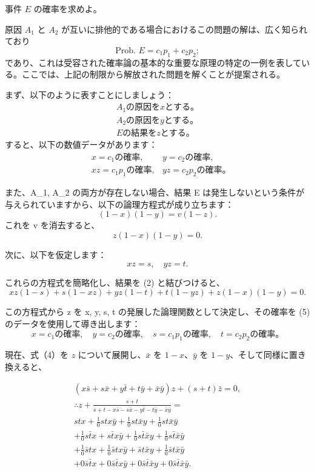 \documentclass[a4paper,11pt,openany]{ltjsbook}
\begin{document}
事件 \(E\) の確率を求めよ。

原因 \(A_1\) と \(A_2\) が互いに排他的である場合におけるこの問題の解は、広く知られており
\[
  \text{Prob. } E = c_1p_1 + c_2p_2;
\]
であり、これは受容された確率論の基本的な重要な原理の特定の一例を表している。ここでは、上記の制限から解放された問題を解くことが提案される。

まず、以下のように表すことにしましょう：
\[
\begin{array}{cccccc}
  A_1 の原因を x とする。\\
  A_2 の原因を y とする。\\
  E の結果を z とする。
\end{array}
\]
すると、以下の数値データがあります：
\begin{align*}
  &x = c_1 の確率,     &y = c_2 の確率,   \\
  &xz = c_1p_1 の確率, &yz = c_2p_2 の確率。 \tag{1}
\end{align*}

また、A\_1, A\_2 の両方が存在しない場合、結果 E は発生しないという条件が与えられていますから、以下の論理方程式が成り立ちます：
\[
(1-x)(1-y) = v(1-z).
\]
これを v を消去すると、
\[
z(1-x)(1-y) = 0. \tag{2}
\]

次に、以下を仮定します：
\[
xz = s, \quad yz = t. \tag{3}
\]

これらの方程式を簡略化し、結果を (2) と結びつけると、
\[
xz(1-s) + s(1-xz) + yz(1-t) + t(1-yz) + z(1-x)(1-y) = 0. \tag{4}
\]

この方程式から z を x, y, s, t の発展した論理関数として決定し、その確率を (5) のデータを使用して導き出します：
\[
x = c_1 の確率, \quad y = c_2 の確率, \quad
s = c_1p_1 の確率, \quad t = c_2p_2 の確率。 \tag{5}
\]

現在、式（4）を \( z \) について展開し、\(\bar{x}\) を \(1 - x\)、\(\bar{y}\) を \(1 - y\)、そして同様に置き換えると、

\begin{gather*}
(x\bar{s} + s\bar{x} + y\bar{t} + t\bar{y} + \bar{x}\bar{y})z
+ (s + t)\bar{z} = 0, \\
\therefore z + \frac{s+t}{s + t - x\bar{s} - s\bar{x} - y\bar{t} - t\bar{y} - \bar{x}\bar{y}} = \\
stx + \frac{1}{0}stx\bar{y}
+ \frac{1}{0}st\bar{x}y
+ \frac{1}{0}st\bar{x}\bar{y} \\
+ \frac{1}{0}s\bar{t}x + s\bar{t}x\bar{y}
+ \frac{1}{0}s\bar{t}\bar{x}y
+ \frac{1}{0}s\bar{t}\bar{x}\bar{y}\\
+ \frac{1}{0}\bar{s}tx + \frac{1}{0}\bar{s}tx\bar{y}
+ \bar{s}t\bar{x}y
+ \frac{1}{0}\bar{s}t\bar{x}\bar{y} \\
+ 0\bar{s}\bar{t}x + 0\bar{s}\bar{t}x\bar{y}
+ 0\bar{s}\bar{t}\bar{x}y
+ 0\bar{s}\bar{t}\bar{x}\bar{y}. \tag{6}
\end{gather*}
\end{document}
